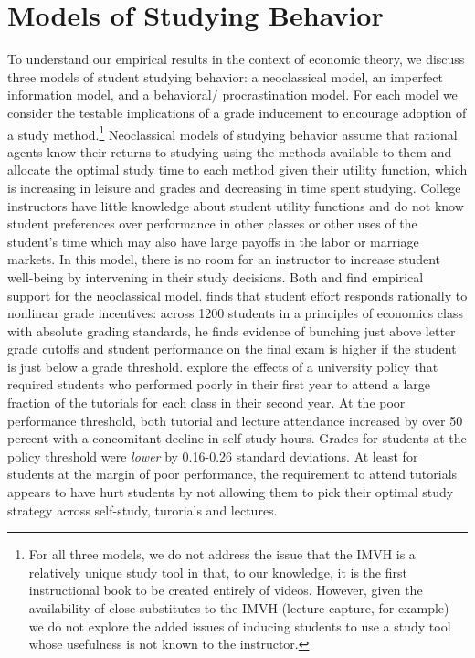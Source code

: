 \documentclass[12pt]{article}
\begin{document}
\section{Models of Studying Behavior} \label{models}

To understand our empirical results in the context of economic theory, we discuss three models of student studying behavior: a neoclassical model, an imperfect information model, and a behavioral/ procrastination model. For each model we consider the testable implications of a grade inducement to encourage adoption of a study method.\footnote{For all three models, we do not address the issue that the IMVH is a relatively unique study tool in that, to our knowledge, it is the first instructional book to be created entirely of videos. However, given the availability of close substitutes to the IMVH (lecture capture, for example) we do not explore the added issues of inducing students to use a study tool whose usefulness is not known to the instructor.} Neoclassical models of studying behavior assume that rational agents know their returns to studying using the methods available to them and allocate the optimal study time to each method given their utility function, which is increasing in leisure and grades and decreasing in time spent studying. College instructors have little knowledge about student utility functions and do not know student preferences over performance in other classes or other uses of the student's time which may also have large payoffs in the labor or marriage markets. In this model, there is no room for an instructor to increase student well-being by intervening in their study decisions. Both \textcite{oettinger2002} and \textcite{kow2020} find empirical support for the neoclassical model. \textcite{oettinger2002} finds that student effort responds rationally to nonlinear grade incentives: across 1200 students in a principles of economics class with absolute grading standards, he finds evidence of bunching just above letter grade cutoffs and student performance on the final exam is higher if the student is just below a grade threshold. \textcite{kow2020} explore the effects of a university policy that required students who performed poorly in their first year to attend a large fraction of the tutorials for each class in their second year. At the poor performance threshold, both tutorial and lecture attendance increased by over 50 percent with a concomitant decline in self-study hours. Grades for students at the policy threshold were \textit{lower} by 0.16-0.26 standard deviations. At least for students at the margin of poor performance, the requirement to attend tutorials appears to have hurt students by not allowing them to pick their optimal study strategy across self-study, turorials and lectures.
\end{document}
